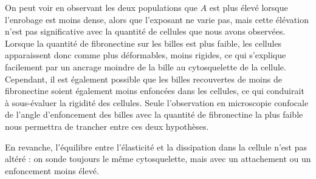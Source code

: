 On peut voir en observant les deux populations que $A$ est plus élevé lorsque l'enrobage est moins dense, alors que l'exposant ne varie pas, mais cette élévation n'est pas significative avec la quantité de cellules que nous avons observées.
Lorsque la quantité de fibronectine sur les billes est plus faible, les cellules apparaissent donc comme plus déformables, moins rigides, ce qui s'explique facilement par un ancrage moindre de la bille au cytosquelette de la cellule.  Cependant, il est également possible que les billes recouvertes de moins de fibronectine soient également moins enfoncées dans les cellules, ce qui conduirait à sous-évaluer la rigidité des cellules. Seule l'observation en microscopie confocale de l'angle d'enfoncement des billes avec la quantité de fibronectine la plus faible nous permettra de trancher entre ces deux hypothèses. 

En revanche, l'équilibre entre l'élasticité et la dissipation dans la cellule n'est pas altéré : on sonde toujours le même cytosquelette, mais avec un attachement ou un enfoncement moins élevé. 

